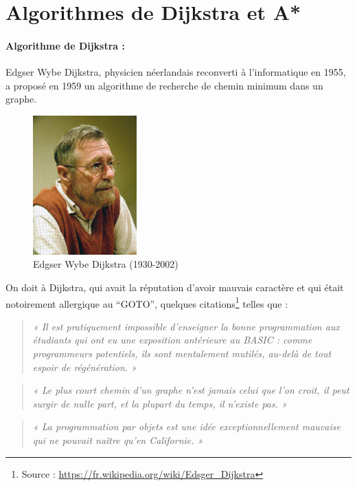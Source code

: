 \section{Algorithmes de Dijkstra et A*}


\paragraph{Algorithme de Dijkstra : }Edgser Wybe Dijkstra, physicien néerlandais reconverti à l'informatique en 1955, a proposé en 1959 un algorithme de recherche de chemin minimum dans un graphe.

\begin{figure}[htp]
  \centering
  \includegraphics[width=4cm]{images/Edsger_Wybe_Dijkstra}
  \caption{Edgser Wybe Dijkstra (1930-2002)}
  \label{fig:une-autre-image}
\end{figure}

On doit à Dijkstra, qui avait la réputation d'avoir mauvais caractère et qui était notoirement allergique au ``GOTO'',
quelques citations\footnote{Source : \url{https://fr.wikipedia.org/wiki/Edsger_Dijkstra}} telles que :


\begin{quote}
\textit{« Il est pratiquement impossible d'enseigner la bonne programmation aux étudiants 
qui ont eu une exposition antérieure au BASIC : comme programmeurs potentiels, 
ils sont mentalement mutilés, au-delà de tout espoir de régénération. »}
\end{quote}

\begin{quote}
\textit{« Le plus court chemin d'un graphe n'est jamais celui que l'on croit, 
il peut surgir de nulle part, et la plupart du temps, il n'existe pas. »}
\end{quote}

\begin{quote}
\textit{« La programmation par objets est une idée exceptionnellement mauvaise qui ne pouvait naître qu'en Californie. »}
\end{quote}


